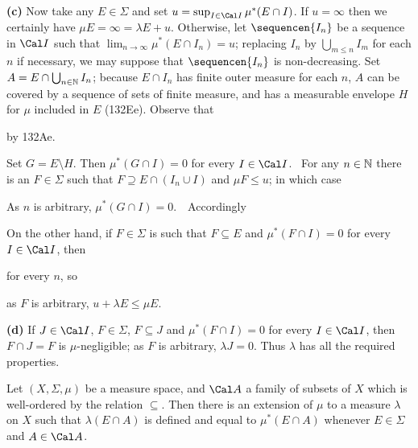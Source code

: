 {\medskip

{\bf (c)} Now take any $E\in\Sigma$ and set
$u=\sup_{I\in\Cal I}\mu^*(E\cap I)$.   If $u=\infty$ then
we certainly have
$\mu E=\infty=\lambda E+u$.
Otherwise, let $\sequencen{I_n}$ be a sequence in $\Cal I$ such that
$\lim_{n\to\infty}\mu^*(E\cap I_n)=u$;  replacing $I_n$ by
$\bigcup_{m\le n}I_m$ for each $n$ if necessary, we may suppose that
$\sequencen{I_n}$ is non-decreasing.   Set
$A=E\cap\bigcup_{n\in\Bbb N}I_n$;   because $E\cap I_n$ has finite outer
measure for each $n$, $A$ can be covered by a sequence of sets of finite
measure, and has a measurable envelope $H$ for $\mu$ included in
$E$ (132Ee).   Observe that


\noindent by 132Ae.

Set $G=E\setminus H$.   Then $\mu^*(G\cap I)=0$ for every $I\in\Cal I$.
\Prf\ For any $n\in\Bbb N$ there is an $F\in\Sigma$
such that $F\supseteq E\cap(I_n\cup I)$ and $\mu F\le u$;  in which case


\noindent As $n$ is arbitrary, $\mu^*(G\cap I)=0$.\ \QeD\   Accordingly


\noindent On the other hand, if $F\in\Sigma$ is such that $F\subseteq E$
and $\mu^*(F\cap I)=0$ for every $I\in\Cal I$, then


\noindent for every $n$, so


\noindent as $F$ is arbitrary, $u+\lambda E\le\mu E$.

\medskip

{\bf (d)} If $J\in\Cal I$, $F\in\Sigma$, $F\subseteq J$ and
$\mu^*(F\cap I)=0$ for every $I\in\Cal I$, then $F\cap J=F$ is
$\mu$-negligible;  as $F$ is arbitrary, $\lambda J=0$.
Thus $\lambda$ has all the required properties.
}%

Let $(X,\Sigma,\mu)$ be a measure space, and
$\Cal A$ a family of subsets of $X$ which is well-ordered by the relation
$\subseteq$.   Then there is an extension of $\mu$ to a measure $\lambda$
on $X$ such that $\lambda(E\cap A)$ is defined and equal to
$\mu^*(E\cap A)$ whenever $E\in\Sigma$ and $A\in\Cal A$.

